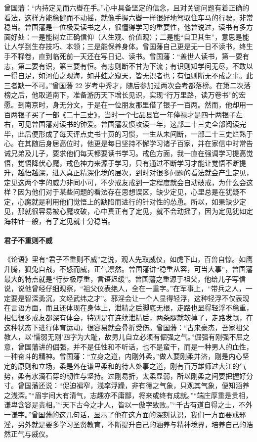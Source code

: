 曾国藩：“内持定见而六辔在手。”心中具备坚定的信念，且对关键问题有着正确的看法，这样方能稳健而不动摇，就像手握六辔一样很好地驾驭住车马的行驶，非常稳当。曾国藩是一位极爱读书之人，很懂得学习的重要性，他曾说过，读书有多方面好处：一是能树立正确信仰（人生观、价值观）；二是能“自卫其生”，意思是能让人学到生存技巧、本领；三是能保养身体。曾国藩自己更是无一日不读书，终生手不释卷，直到临死前一天还在写日记、读书。曾国藩：“盖世人读书，第一要有志，第二要有识，第三要有恒。有志则断不甘为下流；有识则知学问无尽，不敢以一得自足，如河伯之观海，如井蛙之窥天，皆无识者也；有恒则断无不成之事。此三者缺一不可。”曾国藩 22 岁考中秀才，随后参加过两次会考都落榜。在第二次落榜之后，他取道南下，准备游历天下增长见识，实现“行万里路，读万卷书”的宏愿。到南京时，身无分文，于是在一位朋友那里借了银子一百两。然而，他却用一百两银子买了一部《二十三史》，当时一个七品县官一年俸禄才是四十两银子左右，可见曾国藩对读书的钟爱。曾国藩发愤攻读一年，这部二十三史全部阅读完毕，此后便形成了每天评点史书十页的习惯，一生从未间断，一部二十三史烂熟于心。在其随后身居高位时，他更是每日坚持不懈学习诸子百家，并在家信中时常告诫兄弟及儿子，要求他们每天都要读书学习。戒色方面，我一直在强调学习提高觉悟，觉悟降伏心魔，戒色神力来源于学习，只有通过不断学习才能让觉悟不断提升，越悟越深，进入真正精深化境的层次，到时对很多问题的看法就会产生定见，定见这两个字的威力非同小可，不少戒友戒到一定程度就会自动破戒，为什么会这样？因为他们对于某些问题的看法存在思想误区，缺少定见，心里总是在犹疑不定，心魔就是利用他们觉悟上的缺陷而进行的针对性的怂恿。所以，如果缺少定见，那就很容易被心魔攻破，心中真正有了定见，就不会动摇了，因为定见犹如定海神针一般，有了定见就十分稳当。

\paragraph{君子不重则不威}

《论语》里有“君子不重则不威”之说，观人先取威仪，如虎下山，百兽自惊。如鹰升腾，狐兔自战，不怒而威，正气凛然。曾国藩讲“稳重从容，可当大事”，曾国藩最大的特点就是“行步极厚重，言语迟缓”。曾国藩之重源于祖父，他给儿子写信说，说他曾经仔细观察，“祖父仪表绝人，全在一重字。”在军事上，“带兵之人，一定要是智深勇沉，文经武纬之才”。邪淫会让一个人显得轻浮，这种轻浮不仅表现在言语方面，而且还体现在身体上，泄精之后脚底无根，走路也显得轻浮不稳重，相信很多戒友都深有体会，特别是在连续泄精后，两条腿就软掉了，走路发飘，在这种状态下进行体育运动，很容易就会骨折受伤。曾国藩：“古来豪杰，吾家祖父教人，以‘懦弱无刚’四字为大耻，故男儿自立必须有倔强之气。”倔强有刚强不屈之意，曾国藩讲的倔强，并不是任性和不听话，也不是蛮干，而是一种男人的血性，一种奋斗的精神。曾国藩：“立身之道，内刚外柔。”做人要刚柔并济，刚是内心坚定的原则和立场，柔是外在谦卑柔和的待人处事之道，刚有百万雄师过大江的气势，柔有水滴石穿的韧性与坚持。过刚易折，太柔显弱，所以刚柔之间要把握好分寸。曾国藩还说：“促迫褊窄，浅率浮躁，非有德之气象，只观其气象，便知涵养之浅深。”“眉宇间大有清气，志趣亦不庸鄙，将来或终有成就。”“端庄厚重是贵相，谦卑含容是贵相。”“天下古今之才人，皆以一傲字致败。”“千古有道自得之士，不外一谦字。”曾国藩的这几句话，显示了他在这方面的深刻认识，我们一方面要戒邪淫，另外就是要多学习圣贤教育，不断提升自己的涵养与精神境界，培养自己的浩然正气与威仪。


